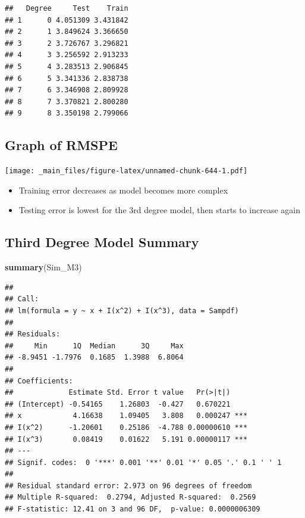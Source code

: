 \documentclass[]{book}
\newenvironment{Shaded}{\begin{snugshade}}{\end{snugshade}}
\newcommand{\KeywordTok}[1]{\textcolor[rgb]{0.13,0.29,0.53}{\textbf{#1}}}
\newcommand{\NormalTok}[1]{#1}
\providecommand{\tightlist}{%
  \setlength{\itemsep}{0pt}\setlength{\parskip}{0pt}}
\begin{document}
\begin{verbatim}
##   Degree     Test    Train
## 1      0 4.051309 3.431842
## 2      1 3.849624 3.366650
## 3      2 3.726767 3.296821
## 4      3 3.256592 2.913233
## 5      4 3.283513 2.906845
## 6      5 3.341336 2.838738
## 7      6 3.346908 2.809928
## 8      7 3.370821 2.800280
## 9      8 3.350198 2.799066
\end{verbatim}

\subsection{Graph of RMSPE}\label{graph-of-rmspe}

\texttt{[image: \_main\_files/figure-latex/unnamed-chunk-644-1.pdf]}

\begin{itemize}
\tightlist
\item
  Training error decreases as model becomes more complex\\
\item
  Testing error is lowest for the 3rd degree model, then starts to
  increase again
\end{itemize}

\subsection{Third Degree Model
Summary}\label{third-degree-model-summary}

\begin{Shaded}
\begin{Highlighting}[]
\KeywordTok{summary}\NormalTok{(Sim_M3)}
\end{Highlighting}
\end{Shaded}

\begin{verbatim}
## 
## Call:
## lm(formula = y ~ x + I(x^2) + I(x^3), data = Sampdf)
## 
## Residuals:
##     Min      1Q  Median      3Q     Max 
## -8.9451 -1.7976  0.1685  1.3988  6.8064 
## 
## Coefficients:
##             Estimate Std. Error t value   Pr(>|t|)    
## (Intercept) -0.54165    1.26803  -0.427   0.670221    
## x            4.16638    1.09405   3.808   0.000247 ***
## I(x^2)      -1.20601    0.25186  -4.788 0.00000610 ***
## I(x^3)       0.08419    0.01622   5.191 0.00000117 ***
## ---
## Signif. codes:  0 '***' 0.001 '**' 0.01 '*' 0.05 '.' 0.1 ' ' 1
## 
## Residual standard error: 2.973 on 96 degrees of freedom
## Multiple R-squared:  0.2794, Adjusted R-squared:  0.2569 
## F-statistic: 12.41 on 3 and 96 DF,  p-value: 0.0000006309
\end{verbatim}
\end{document}
